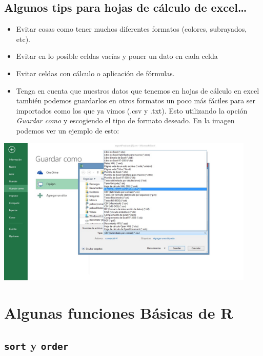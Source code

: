 \documentclass[
]{book}
\providecommand{\tightlist}{%
  \setlength{\itemsep}{0pt}\setlength{\parskip}{0pt}}
\begin{document}
\subsection{Algunos tips para hojas de cálculo de excel\ldots{}}\label{algunos-tips-para-hojas-de-cuxe1lculo-de-excel}

\begin{itemize}
\tightlist
\item
  Evitar cosas como tener muchos diferentes formatos (colores, subrayados, etc).
\item
  Evitar en lo posible celdas vacías y poner un dato en cada celda
\item
  Evitar celdas con cálculo o aplicación de fórmulas.
\item
  Tenga en cuenta que nuestros datos que tenemos en hojas de cálculo en excel también podemos guardarlos en otros formatos un poco más fáciles para ser importados como los que ya vimos (.csv y .txt). Esto utilizando la opción \emph{Guardar como} y escogiendo el tipo de formato deseado. En la imagen podemos ver un ejemplo de esto:
\end{itemize}

\begin{center}\includegraphics[width=350pt]{images//saveexcel} \end{center}

\section{Algunas funciones Básicas de R}\label{algunas-funciones-buxe1sicas-de-r}

\subsection{\texorpdfstring{\texttt{sort} y \texttt{order}}{sort y order}}\label{sort-y-order}
\end{document}

